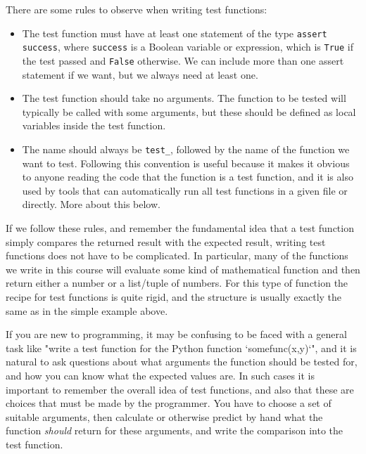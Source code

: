 \documentclass[graybox,envcountchap,sectrefs,final]{svmonodo}
\begin{document}
There are some rules to observe when writing test functions:
\begin{itemize}
 \item The test function must have at least one statement of the type \texttt{assert success}, where \texttt{success} is a Boolean variable
   or expression, which is \texttt{True}
   if the test passed and \texttt{False} otherwise. We can include more than one assert statement if we want, but we always
   need at least one.

 \item The test function should take no arguments. The function to be tested will typically be called with some arguments,
   but these should be defined as local variables inside the test function.

 \item The name should always be \Verb!test_!, followed by the name of the function we want to test. Following this convention
   is useful because it makes it obvious to anyone reading the code that the function is a test function, and it is also
   used by tools that can automatically run all test functions in a given file or directly. More about this below.
\end{itemize}

\noindent
If we follow these rules, and remember the fundamental idea that a test function simply compares the returned
result with the expected result, writing test functions does not have to be complicated. In particular, many of the
functions we write in this course will evaluate some kind of mathematical function and then
return either a number or a list/tuple of numbers. For this type of function the recipe for test functions
is quite rigid, and the structure is usually exactly the same as in the simple example above.

If you are new
to programming, it may be confusing to be faced with a general task like
"write a test function for the Python function `somefunc(x,y)`", and it is natural to ask questions about what arguments
the function should be tested for, and how you can know what the expected values are. In such cases it is important
to remember the overall idea of test functions, and also that these are choices that must be made by the programmer.
You have to choose a set of suitable arguments, then calculate
or otherwise predict by hand what the function \emph{should} return for these arguments, and write the comparison into the
test function.
\end{document}
